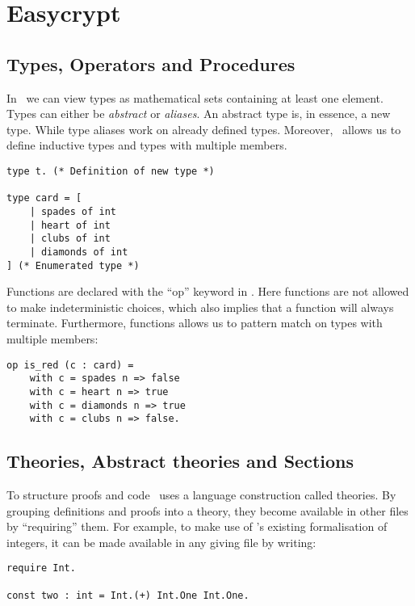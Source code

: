 \section{Easycrypt}
\label{sec:label}

\subsection{Types, Operators and Procedures}
\label{sec:ec_types_and_operators}
In \easycrypt\ we can view types as mathematical sets containing at least one
element. Types can either be \textit{abstract} or \textit{aliases}. An abstract
type is, in essence, a new type. While type aliases work on already defined
types.
Moreover, \easycrypt\ allows us to define inductive types and types with
multiple members.
\begin{lstlisting}
type t. (* Definition of new type *)

type card = [
    | spades of int
    | heart of int
    | clubs of int
    | diamonds of int
] (* Enumerated type *)
\end{lstlisting}

\noindent
Functions are declared with the ``op'' keyword in \easycrypt.
Here functions are not allowed to make indeterministic choices, which also
implies that a function will always terminate.
Furthermore, functions allows us to pattern match on types with
multiple members:
\begin{lstlisting}
op is_red (c : card) =
    with c = spades n => false
    with c = heart n => true
    with c = diamonds n => true
    with c = clubs n => false.
\end{lstlisting}


\subsection{Theories, Abstract theories and Sections}
\label{sec:ec_theories}
To structure proofs and code \easycrypt\ uses a language construction called
theories. By grouping definitions and proofs into a theory, they become available
in other files by ``requiring'' them. For example, to make use of \easycrypt's
existing formalisation of integers, it can be made available in any giving file
by writing:

\begin{lstlisting}[float,label=lst:theory_require,caption=\easycrypt\ theories: importing definitions]
require Int.

const two : int = Int.(+) Int.One Int.One.
\end{lstlisting}

